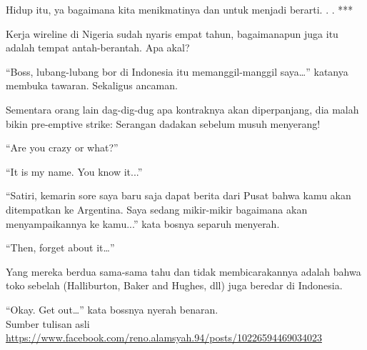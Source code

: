 Hidup itu, ya bagaimana kita menikmatinya dan untuk menjadi berarti.
.
.
***

Kerja wireline di Nigeria sudah nyaris empat tahun, bagaimanapun juga itu adalah tempat antah-berantah. Apa akal?

“Boss, lubang-lubang bor di Indonesia itu memanggil-manggil saya…” katanya membuka tawaran. Sekaligus ancaman.

Sementara orang lain dag-dig-dug apa kontraknya akan diperpanjang, dia malah bikin pre-emptive strike: Serangan dadakan sebelum musuh menyerang!

“Are you crazy or what?”

“It is my name. You know it...”

“Satiri, kemarin sore saya baru saja dapat berita dari Pusat bahwa kamu akan ditempatkan ke Argentina. Saya sedang mikir-mikir bagaimana akan menyampaikannya ke kamu...” kata bosnya separuh menyerah.

“Then, forget about it…”

Yang mereka berdua sama-sama tahu dan tidak membicarakannya adalah bahwa toko sebelah (Halliburton, Baker and Hughes, dll) juga beredar di Indonesia.

“Okay. Get out…” kata bossnya nyerah benaran.
\\[10pt]

Sumber tulisan asli \url{https://www.facebook.com/reno.alamsyah.94/posts/10226594469034023}

